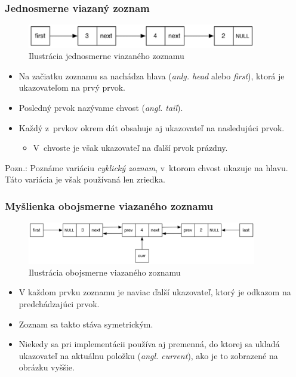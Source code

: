 \documentclass{beamer}
\begin{document}
  \begin{frame}
    \frametitle{Jednosmerne viazaný zoznam}
    \begin{center}
      \begin{figure}
        \includegraphics[width=10cm]{./src/sll.eps}
        \caption{Ilustrácia jednosmerne viazaného zoznamu \cite{ll}}
      \end{figure}
    \end{center}
    \begin{itemize}
      \item Na začiatku zoznamu sa nachádza hlava (\textit{anlg. head} alebo 
        \textit{first}), ktorá je ukazovateľom na prvý prvok. 
      \item Posledný prvok nazývame chvost (\textit{angl. tail}). 
      \item Každý z~prvkov okrem dát obsahuje aj ukazovateľ na nasledujúci prvok. 
        \begin{itemize}
          \item V~chvoste je však ukazovateľ na ďalší prvok prázdny.
        \end{itemize}
    \end{itemize}
    \bigskip
    \small Pozn.: Poznáme variáciu \textit{cyklický zoznam}, v~ktorom
    chvost ukazuje na hlavu. Táto variácia je však používaná len zriedka.
  \end{frame}

  \begin{frame}
    \frametitle{Myšlienka obojsmerne viazaného zoznamu}
    \begin{center}
      \begin{figure}
        \includegraphics[width=10cm]{./src/dll.eps}
        \caption{Ilustrácia obojsmerne viazaného zoznamu \cite{ll}}
      \end{figure}
    \end{center}
    \begin{itemize}
      \item V každom prvku zoznamu je naviac ďalší ukazovateľ, ktorý je 
        odkazom na predchádzajúci prvok. 
      \item Zoznam sa takto stáva symetrickým.
      \item Niekedy sa pri implementácii používa aj premenná, do ktorej sa ukladá
        ukazovateľ na aktuálnu položku (\textit{angl. current}), ako je to
        zobrazené na obrázku vyššie.
    \end{itemize}
  \end{frame}
\end{document}
